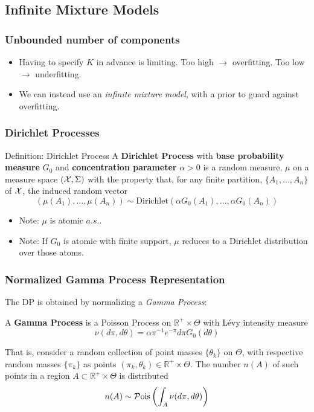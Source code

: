 \documentclass[11pt, serif, mathserif, table,trans]{beamer}
\begin{document}
\subsection{Infinite Mixture Models}
\label{sec:dirichl-proc-mixt}
\begin{frame}
  \frametitle{Unbounded number of components}
  \begin{itemize}
  \item Having to specify $K$ in advance is limiting.  Too high $\to$
    overfitting.  Too low $\to$ underfitting.
  \item We can instead use an {\it infinite mixture model}, with a
    prior to guard against overfitting.
  \end{itemize}
\end{frame}

\begin{frame}
  \frametitle{Dirichlet Processes}
  \begin{infoblock}{Definition: Dirichlet Process}
    A {\bf Dirichlet Process} \cite{ferguson1973bayesian} with {\bf
      base probability measure} $G_0$ and {\bf concentration
      parameter} $\alpha > 0$ is a random measure, $\mu$ on a measure
    space $(\mathcal{X}, \Sigma)$ with the property that, for any finite
    partition, $\{A_1, \dots, A_n\}$ of $\mathcal{X}$, the induced random
    vector
    \begin{equation}
      \label{eq:6}
      (\mu(A_1), \dots, \mu(A_n)) \sim
      \mathrm{Dirichlet}(\alpha G_0(A_1), \dots, \alpha G_0(A_n))
    \end{equation}
  \end{infoblock}
  \begin{itemize}
  \item Note: $\mu$ is atomic $a.s.$.
  \item Note: If $G_0$ is atomic with finite support, $\mu$ reduces to a
    Dirichlet distribution over those atoms.
  \end{itemize}
\end{frame}

\begin{frame}
  \frametitle{Normalized Gamma Process Representation}
  The DP is obtained by normalizing a {\it Gamma Process}:

  A {\bf Gamma Process} is a Poisson Process on $\mathbb{R}^{+} \times
  \Theta$ with L\'evy intensity measure
  \begin{equation}
    \label{eq:8}
    \nu(d\pi, d\theta) = \alpha \pi^{-1} e^{-\pi} d\pi G_0(d\theta)
  \end{equation}

  That is, consider a random collection of point masses $\{\theta_k\}$
  on $\Theta$, with respective random masses $\{\pi_k\}$ as points
  $(\pi_k,\theta_k) \in \mathbb{R}^+ \times \Theta$.  The number $n(A)$
  of such points in a region $A \subset \mathbb{R}^+ \times \Theta$ is
  distributed
  \begin{equation}
    \label{eq:9}
    n(A) \sim \mathcal{P}\mathrm{ois}\left(\int_A \nu(d\pi, d\theta)\right)
  \end{equation}
  
\end{frame}
\end{document}
